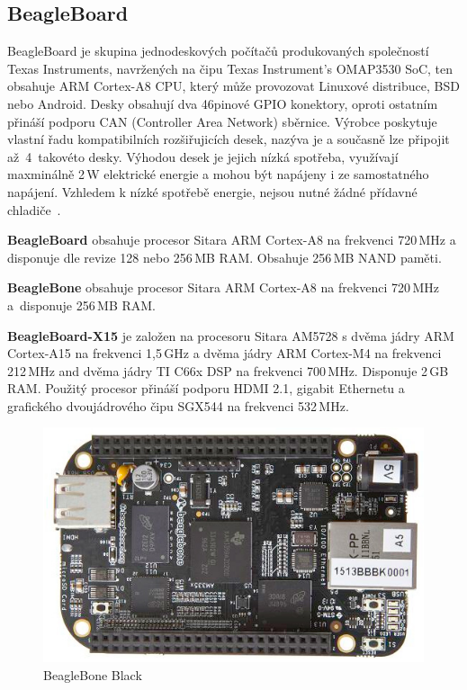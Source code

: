 \subsection{BeagleBoard }
BeagleBoard je skupina jednodeskových počítačů produkovaných společností Texas Instruments, navržených na čipu Texas Instrument's OMAP3530 SoC, ten obsahuje ARM Cortex-A8 CPU, který může provozovat Linuxové distribuce, BSD nebo Android. Desky obsahují dva 46pinové GPIO konektory, oproti ostatním přináší podporu CAN (Controller Area Network) sběrnice. Výrobce poskytuje vlastní řadu kompatibilních rozšiřujicích desek, nazýva je  a současně lze připojit až~4~takovéto desky. Výhodou desek je jejich nízká spotřeba, využívají maxminálně 2\,W elektrické energie a mohou být napájeny i ze samostatného napájení. Vzhledem k nízké spotřebě energie, nejsou nutné žádné přídavné chladiče~\cite{BeagleBone}.

\textbf{BeagleBoard} obsahuje procesor Sitara ARM Cortex-A8 na frekvenci 720\,MHz a disponuje dle revize 128 nebo 256\,MB RAM. Obsahuje 256\,MB NAND paměti.

\textbf{BeagleBone} obsahuje procesor Sitara ARM Cortex-A8 na frekvenci 720\,MHz a~disponuje 256\,MB RAM.

\textbf{BeagleBoard-X15} je založen na procesoru Sitara AM5728 s dvěma jádry ARM Cortex-A15 na frekvenci 1,5\,GHz a dvěma jádry ARM Cortex-M4 na frekvenci 212\,MHz and dvěma jádry TI C66x DSP na frekvenci 700\,MHz. Disponuje 2\,GB RAM. Použitý procesor přináší podporu HDMI 2.1, gigabit Ethernetu a grafického dvoujádrového čipu SGX544 na frekvenci 532\,MHz. 

	\begin{figure}[!ht]
  \begin{center}
    \includegraphics[scale=0.7]{obrazky/embed_beaglebone_black}
  \end{center}
	\vspace{-20pt}
  \caption{BeagleBone Black~\cite{BeagleBone}}
\end{figure}

